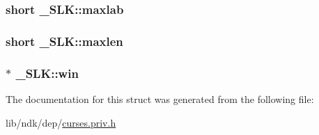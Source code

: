 \hypertarget{struct___s_l_k_a116fc4ed366a98270a12a48584c63424}{
\subsubsection[{maxlab}]{\setlength{\rightskip}{0pt plus 5cm}short \-\_\-\-S\-L\-K\-::maxlab}}\label{struct___s_l_k_a116fc4ed366a98270a12a48584c63424}
\hypertarget{struct___s_l_k_a41069f0cc83ebd79eda3e36f2ca657fd}{
\subsubsection[{maxlen}]{\setlength{\rightskip}{0pt plus 5cm}short \-\_\-\-S\-L\-K\-::maxlen}}\label{struct___s_l_k_a41069f0cc83ebd79eda3e36f2ca657fd}
\hypertarget{struct___s_l_k_aa4afb711773305bb8be9194a8315d0f0}{
\subsubsection[{win}]{$\ast$ \-\_\-\-S\-L\-K\-::win}}\label{struct___s_l_k_aa4afb711773305bb8be9194a8315d0f0}


The documentation for this struct was generated from the following file\-:\begin{DoxyCompactItemize}
\item 
lib/ndk/dep/\hyperlink{curses_8priv_8h}{curses.\-priv.\-h}\end{DoxyCompactItemize}

